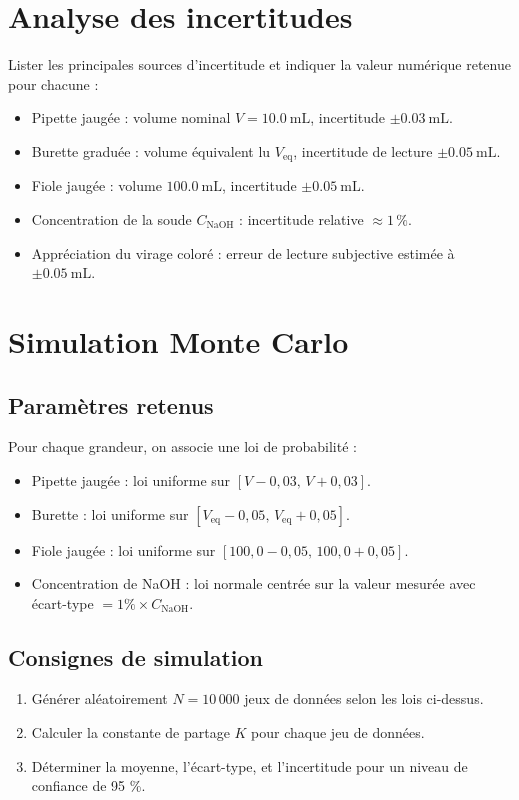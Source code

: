 \documentclass[12pt,a4paper]{article}
\begin{document}
	\section{Analyse des incertitudes}
Lister les principales sources d’incertitude et indiquer la valeur numérique retenue pour chacune :
	\begin{itemize}
		\item Pipette jaugée : volume nominal $V = \SI{10,0}{\milli\liter}$, incertitude $\pm \SI{0,03}{\milli\liter}$.
		\item Burette graduée : volume équivalent lu $V_\text{eq}$, incertitude de lecture $\pm \SI{0,05}{\milli\liter}$.
		\item Fiole jaugée : volume $\SI{100,0}{\milli\liter}$, incertitude $\pm \SI{0,05}{\milli\liter}$.
		\item Concentration de la soude $C_\text{NaOH}$ : incertitude relative $\approx 1\,\%$.
		\item Appréciation du virage coloré : erreur de lecture subjective estimée à $\pm \SI{0,05}{\milli\liter}$.
	\end{itemize}
	
	\section{Simulation Monte Carlo}
\subsection{Paramètres retenus}
Pour chaque grandeur, on associe une loi de probabilité :
\begin{itemize}
	\item Pipette jaugée : loi uniforme sur $[V - 0,03,\, V + 0,03]$.
	\item Burette : loi uniforme sur $[V_\text{eq} - 0,05,\, V_\text{eq} + 0,05]$.
	\item Fiole jaugée : loi uniforme sur $[100,0 - 0,05,\, 100,0 + 0,05]$.
	\item Concentration de NaOH : loi normale centrée sur la valeur mesurée avec écart-type $= 1\% \times C_\text{NaOH}$.
\end{itemize}

\subsection{Consignes de simulation}
\begin{enumerate}
	\item Générer aléatoirement $N = 10\,000$ jeux de données selon les lois ci-dessus.
	\item Calculer la constante de partage $K$ pour chaque jeu de données.
	\item Déterminer la moyenne, l’écart-type, et l'incertitude pour un niveau de confiance de 95 \%.
\end{enumerate}
\end{document}
